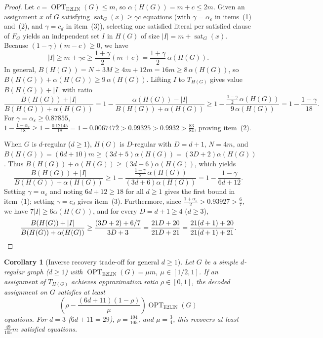 \documentclass[pdflatex,sn-mathphys-num]{sn-jnl}%
\theoremstyle{thmstyleone}%
\newtheorem{Corollary}[Theorem]{Corollary}
\theoremstyle{thmstyletwo}%
\theoremstyle{thmstylethree}%
\begin{document}
\begin{proof}
Let $c = \operatorname{OPT}_{\mathrm{E2LIN}}(G) \le m$, so $\alpha(H(G)) = m + c \le 2m$. Given an assignment $x$ of $G$ satisfying $\operatorname{sat}_G(x) \ge \gamma c$ equations (with $\gamma = \alpha_\varepsilon$ in items~(1) and~(2), and $\gamma = c_d$ in item~(3)), selecting one satisfied literal per satisfied clause of $F_G$ yields an independent set $I$ in $H(G)$ of size $|I| = m + \operatorname{sat}_G(x)$. Because $(1-\gamma)(m-c) \ge 0$, we have
\[
|I| \ge m + \gamma c \ge \frac{1+\gamma}{2}(m+c) = \frac{1+\gamma}{2}\,\alpha(H(G)).
\]
In general, $B(H(G)) = N + 3M \ge 4m + 12m = 16m \ge 8\,\alpha(H(G))$, so $B(H(G)) + \alpha(H(G)) \ge 9\,\alpha(H(G))$. Lifting $I$ to $T_{H(G)}$ gives value $B(H(G)) + |I|$ with ratio
\[
\frac{B(H(G))+|I|}{B(H(G))+\alpha(H(G))} = 1 - \frac{\alpha(H(G)) - |I|}{B(H(G))+\alpha(H(G))} \ge 1 - \frac{\frac{1-\gamma}{2}\,\alpha(H(G))}{9\,\alpha(H(G))} = 1 - \frac{1-\gamma}{18}.
\]
For $\gamma = \alpha_\varepsilon \ge 0.87855$, $1 - \frac{1-\alpha_\varepsilon}{18} \ge 1 - \frac{0.12145}{18} = 1 - 0.006747\overline{2} > 0.99325 > 0.9932 > \frac{83}{84}$, proving item~(2).

When $G$ is $d$-regular ($d \ge 1$), $H(G)$ is $D$-regular with $D = d+1$, $N = 4m$, and $B(H(G)) = (6d+10)m \ge (3d+5)\alpha(H(G)) = (3D+2)\alpha(H(G))$. Thus $B(H(G)) + \alpha(H(G)) \ge (3d+6)\alpha(H(G))$, which yields
\[
\frac{B(H(G))+|I|}{B(H(G))+\alpha(H(G))} \ge 1 - \frac{\frac{1-\gamma}{2}\,\alpha(H(G))}{(3d+6)\alpha(H(G))} = 1 - \frac{1-\gamma}{6d+12}.
\]
Setting $\gamma = \alpha_\varepsilon$ and noting $6d+12 \ge 18$ for all $d \ge 1$ gives the first bound in item~(1); setting $\gamma = c_d$ gives item~(3). Furthermore, since $\frac{1+\alpha_\varepsilon}{2} > 0.93927 > \frac{6}{7}$, we have $7|I| \ge 6\alpha(H(G))$, and for every $D = d+1 \ge 4$ ($d \ge 3$),
\[
\frac{B(H(G))+|I|}{B(H(G))+\alpha(H(G))} \ge \frac{(3D+2) + 6/7}{3D+3} = \frac{21D+20}{21D+21} = \frac{21(d+1)+20}{21(d+1)+21}. \qedhere
\]
\end{proof}

\begin{Corollary}[Inverse recovery trade-off for general $d \ge 1$]\label{cor:inverse}
Let $G$ be a simple $d$-regular graph ($d \ge 1$) with $\operatorname{OPT}_{\mathrm{E2LIN}}(G) = \mu m$, $\mu \in [1/2, 1]$. If an assignment of $T_{H(G)}$ achieves approximation ratio $\rho \in [0,1]$, the decoded assignment on $G$ satisfies at least
\[
\left(\rho - \frac{(6d+11)(1-\rho)}{\mu}\right) \operatorname{OPT}_{\mathrm{E2LIN}}(G)
\]
equations. For $d=3$ ($6d+11 = 29$), $\rho = \frac{104}{105}$, and $\mu = \frac{3}{4}$, this recovers at least $\frac{49}{105}m$ satisfied equations.
\end{Corollary}
\end{document}
